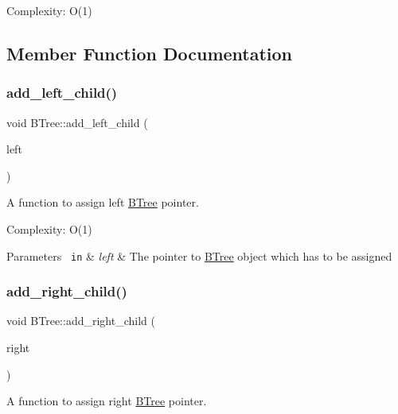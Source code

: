 Complexity\+: O(1) 

\subsection{Member Function Documentation}
\mbox{\label{classBTree_ae80b1f2b89c404206d76e5371c820d7a}} 
\subsubsection{\texorpdfstring{add\+\_\+left\+\_\+child()}{add\_left\_child()}}
{\footnotesize\ttfamily void B\+Tree\+::add\+\_\+left\+\_\+child (\begin{DoxyParamCaption}\item[{\mbox{\hyperlink{classBTree}{B\+Tree}} $\ast$}]{left }\end{DoxyParamCaption})}



A function to assign left \mbox{\hyperlink{classBTree}{B\+Tree}} pointer. 

Complexity\+: O(1) 
\begin{DoxyParams}[1]{Parameters}
\mbox{\texttt{ in}}  & {\em left} & The pointer to \mbox{\hyperlink{classBTree}{B\+Tree}} object which has to be assigned \\
\hline
\end{DoxyParams}
\mbox{\label{classBTree_a03ed2114a3f21b5f1b6b0ae93d7cdc91}} 
\subsubsection{\texorpdfstring{add\+\_\+right\+\_\+child()}{add\_right\_child()}}
{\footnotesize\ttfamily void B\+Tree\+::add\+\_\+right\+\_\+child (\begin{DoxyParamCaption}\item[{\mbox{\hyperlink{classBTree}{B\+Tree}} $\ast$}]{right }\end{DoxyParamCaption})}



A function to assign right \mbox{\hyperlink{classBTree}{B\+Tree}} pointer. 

